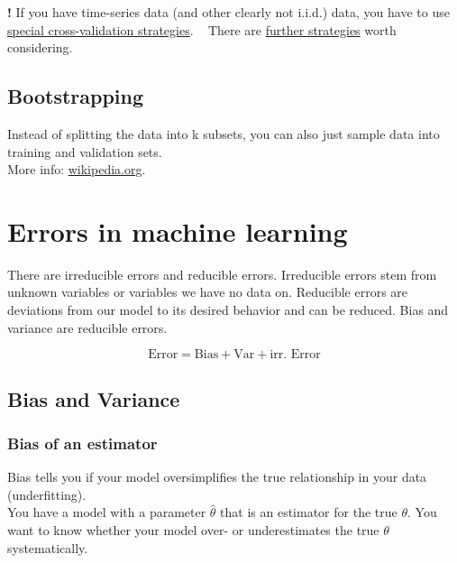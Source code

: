 \documentclass[
]{book}
\begin{document}
\textbf{!} If you have time-series data (and other clearly not i.i.d.) data,
you have to use \href{https://scikit-learn.org/stable/modules/cross_validation.html\#time-series-split}{special cross-validation
strategies}.
~ There are \href{https://scikit-learn.org/stable/modules/cross_validation.html\#time-series-split}{further
strategies}
worth considering.

\hypertarget{bootstrapping}{%
\subsection{Bootstrapping}\label{bootstrapping}}

Instead of splitting the data into k subsets, you can also just sample
data into training and validation sets.\\
More info:
\href{https://en.wikipedia.org/wiki/Bootstrapping_(statistics)}{wikipedia.org}.

\hypertarget{errors-in-machine-learning}{%
\section{Errors in machine learning}\label{errors-in-machine-learning}}

There are irreducible errors and reducible errors. Irreducible errors
stem from unknown variables or variables we have no data on. Reducible
errors are deviations from our model to its desired behavior and can be
reduced. Bias and variance are reducible errors.

\[\text{Error} = \text{Bias} + \text{Var} + \text{irr. Error}\]

\hypertarget{bias-and-variance}{%
\subsection{Bias and Variance}\label{bias-and-variance}}

\hypertarget{bias-of-an-estimator}{%
\subsubsection{Bias of an estimator}\label{bias-of-an-estimator}}

Bias tells you if your model oversimplifies the true relationship in
your data (underfitting).\\
You have a model with a parameter \(\hat{\theta}\) that is an estimator
for the true \(\theta\). You want to know whether your model over- or
underestimates the true \(\theta\) systematically.
\end{document}
